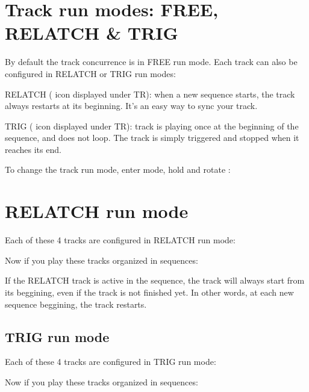 \section{Track run modes: FREE, RELATCH \& TRIG}

By default the track concurrence is in FREE run mode. Each track can also be configured in RELATCH or TRIG run modes:

RELATCH ( icon displayed under TR): when a new sequence starts, the track always restarts at its beginning. It's an easy way to sync your track.

TRIG ( icon displayed under TR): track is playing once at the beginning of the sequence, and does not loop. The track is simply triggered and stopped when it reaches its end.

To change the track run mode, enter  mode, hold  and rotate \encodericon{}:




\section{RELATCH run mode}

Each of these 4 tracks are configured in RELATCH run mode:


Now if you play these tracks organized in sequences:


If the RELATCH track is active in the sequence, the track will always start from its beggining, even if the track is not finished yet. In other words, at each new sequence beggining, the track restarts.


\subsection{TRIG run mode}

Each of these 4 tracks are configured in TRIG run mode:


Now if you play these tracks organized in sequences:


